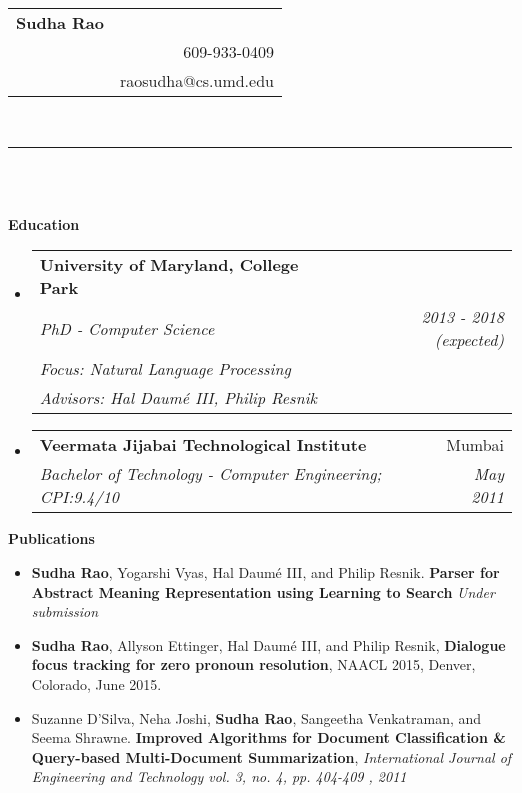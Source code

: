 \documentclass[letterpaper,12pt]{article}
\makeatletter
\newcommand{\resheading}[1]{{\large \colorbox{mygrey}{\begin{minipage}{\textwidth}{\textbf{#1 \vphantom{p\^{E}}}}\end{minipage}}}}
\newcommand{\ressubheadingnew}[6]{
\begin{tabular*}{6in}{l@{\extracolsep{\fill}}r}
		\textbf{#1} & #2 \\
		\textit{#3} & \textit{#4} \\
		\textit{#5} \\
		\textit{#6}
\end{tabular*}\vspace{-6pt}}
\newcommand{\ressubheading}[4]{
\begin{tabular*}{6in}{l@{\extracolsep{\fill}}r}
		\textbf{#1} & #2 \\
		\textit{#3} & \textit{#4} \\
\end{tabular*}\vspace{-6pt}}
\makeatother
\begin{document}
\newcommand{\myheader}{
\begin{tabular*}{6.4in}{l@{\extracolsep{\fill}}r}
	\textbf{\LARGE Sudha Rao}\\
	 & 609-933-0409\\
	 & raosudha@cs.umd.edu\\
	\end{tabular*}
\\
\vspace{0.1in}}

\myheader
\hrule
~\\
~\\
\resheading{Education}
\begin{itemize}
\item []\ressubheadingnew{University of Maryland, College Park}{}{PhD - Computer Science}{2013 - 2018 (expected)} {Focus: Natural Language Processing}{Advisors: Hal Daum\'e III, Philip Resnik}
\item []\ressubheading{Veermata Jijabai Technological Institute}{Mumbai}{Bachelor of Technology - Computer Engineering; CPI:9.4/10}{May 2011}
\end{itemize}

\resheading{Publications}
{\footnotesize
\begin{itemize}
\item \textbf{Sudha Rao}, Yogarshi Vyas, Hal Daum\'e III, and Philip Resnik.  \textbf{Parser for Abstract Meaning Representation using Learning to Search} \textit{Under submission}
\item \textbf{Sudha Rao}, Allyson Ettinger, Hal Daum\'e III, and Philip Resnik, \textbf{Dialogue focus tracking for zero pronoun resolution}, NAACL 2015, Denver, Colorado, June 2015.
\item 
Suzanne D’Silva, Neha Joshi, \textbf{Sudha Rao}, Sangeetha Venkatraman, and Seema Shrawne.  {\textbf{Improved Algorithms for Document Classification \& Query-based Multi-Document Summarization}}, \textit{International Journal of Engineering and Technology vol. 3, no. 4, pp. 404-409 , 2011}
\end{itemize}
}
\end{document}
